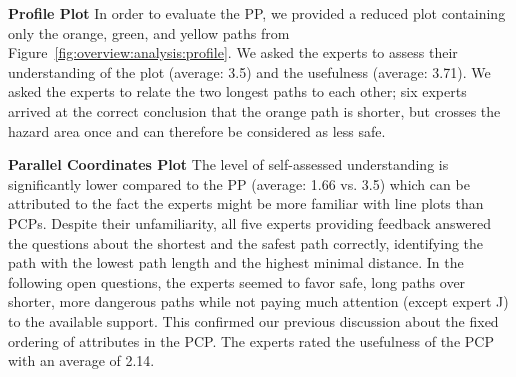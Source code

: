 \documentclass{egpubl}
\begin{document}

\noindent \textbf{Profile Plot} In order to evaluate the PP, we provided a reduced plot containing only the orange, green, and yellow paths from Figure~\ref{fig:overview:analysis:profile}. We asked the experts to assess their understanding of the plot (average: 3.5) and the usefulness (average: 3.71). We asked the experts to relate the two longest paths to each other; six experts arrived at the correct conclusion that the orange path is shorter, but crosses the hazard area once and can therefore be considered as less safe. 

\noindent \textbf{Parallel Coordinates Plot} The level of self-assessed understanding is significantly lower compared to the PP (average: 1.66 vs. 3.5) which can be attributed to the fact the experts might be more familiar with line plots than PCPs. Despite their unfamiliarity, all five experts providing feedback answered the questions about the shortest and the safest path correctly, identifying the path with the lowest path length and the highest minimal distance. In the following open questions, the experts seemed to favor safe, long paths over shorter, more dangerous paths while not paying much attention (except expert J) to the available support. This confirmed our previous discussion about the fixed ordering of attributes in the PCP. The experts rated the usefulness of the PCP with an average of 2.14. 
\end{document}
